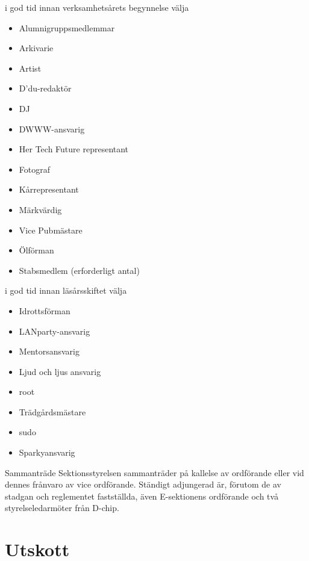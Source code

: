 \documentclass[pdfbookmarks,a4paper,11pt]{article}
\newlength{\itemcollength}
\newenvironment{reglemlista}{%
  \begin{list}{}{%
      \setlength{\labelwidth}{\itemcollength}%
      \setlength{\leftmargin}{\labelwidth + \labelsep}%
      \renewcommand{\makelabel}[1]{%
        \raisebox{0pt}[1ex][0pt]{%
          \makebox[\labelwidth][l]{%
            \parbox[t]{\itemcollength}{%
              \raggedright\hspace{0pt}##1}}}\hfill}%
      }}{%
  \end{list}}
\begin{document}
\begin{reglemlista}
\begin{attlista}
      \item i god tid innan verksamhetsårets begynnelse välja
        \begin{itemize}
	\item Alumnigruppsmedlemmar
          	\item Arkivarie
          	\item Artist
          	\item D'du-redaktör
          	\item DJ
          	\item DWWW-ansvarig
         	\item Her Tech Future representant 
          	\item Fotograf
	\item Kårrepresentant
          	\item Märkvärdig
          \item Vice Pubmästare
          \item Ölförman
          \item Stabsmedlem (erforderligt antal)
        \end{itemize}
      \item i god tid innan läsårsskiftet välja
        \begin{itemize}
          \item Idrottsförman
          \item LANparty-ansvarig
          \item Mentorsansvarig
          \item Ljud och ljus ansvarig
          \item root
          \item Trädgårdsmästare
          \item sudo
          \item Sparkyansvarig
        \end{itemize}
    \end{attlista}
    
    \item[Sammanträde]
    	Sektionsstyrelsen sammanträder på kallelse av ordförande eller vid dennes frånvaro av vice ordförande. Ständigt adjungerad är, förutom de av stadgan och reglementet fastställda, även E-sektionens ordförande och två styrelseledarmöter från D-chip.
    

\end{reglemlista}





\section{Utskott}
\end{document}
